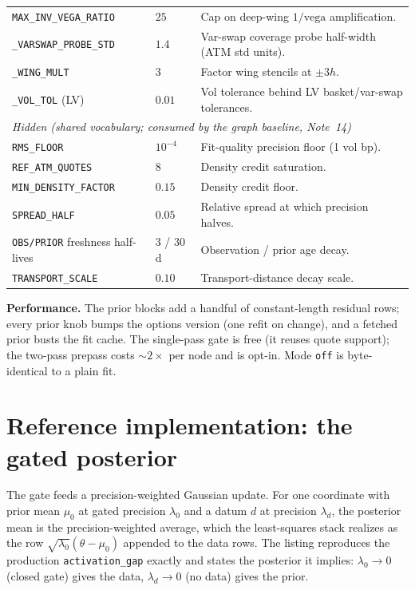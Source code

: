 \documentclass[11pt]{article}
\begin{document}
\begin{longtable}{p{}p{}p{}}
\texttt{MAX\_INV\_VEGA\_RATIO} & $25$ & Cap on deep-wing $1/\text{vega}$
amplification.\\
\texttt{\_VARSWAP\_PROBE\_STD} & $1.4$ & Var-swap coverage probe half-width
(ATM std units).\\
\texttt{\_WING\_MULT} & $3$ & Factor wing stencils at $\pm3h$.\\
\texttt{\_VOL\_TOL} (LV) & $0.01$ & Vol tolerance behind LV basket/var-swap
tolerances.\\
\midrule
\multicolumn{3}{l}{\emph{Hidden (shared vocabulary; consumed by the graph
baseline, Note~14)}}\\ \midrule
\texttt{RMS\_FLOOR} & $10^{-4}$ & Fit-quality precision floor (1 vol bp).\\
\texttt{REF\_ATM\_QUOTES} & $8$ & Density credit saturation.\\
\texttt{MIN\_DENSITY\_FACTOR} & $0.15$ & Density credit floor.\\
\texttt{SPREAD\_HALF} & $0.05$ & Relative spread at which precision halves.\\
\texttt{OBS/PRIOR} freshness half-lives & $3$ / $30$ d & Observation / prior
age decay.\\
\texttt{TRANSPORT\_SCALE} & $0.10$ & Transport-distance decay scale.\\
\bottomrule
\end{longtable}
\normalsize

\noindent\textbf{Performance.} The prior blocks add a handful of
constant-length residual rows; every prior knob bumps the options version
(one refit on change), and a fetched prior busts the fit cache. The
single-pass gate is free (it reuses quote support); the two-pass prepass
costs $\sim2\times$ per node and is opt-in. Mode \texttt{off} is
byte-identical to a plain fit.

\section{Reference implementation: the gated posterior}
\label{app:ref}

The gate feeds a precision-weighted Gaussian update. For one coordinate with
prior mean $\mu_0$ at gated precision $\lambda_0$ and a datum $d$ at
precision $\lambda_d$, the posterior mean is the precision-weighted average,
which the least-squares stack realizes as the row
$\sqrt{\lambda_0}(\theta-\mu_0)$ appended to the data rows. The listing
reproduces the production \texttt{activation\_gap} exactly and states the
posterior it implies: $\lambda_0\to0$ (closed gate) gives the data,
$\lambda_d\to0$ (no data) gives the prior.
\end{document}
